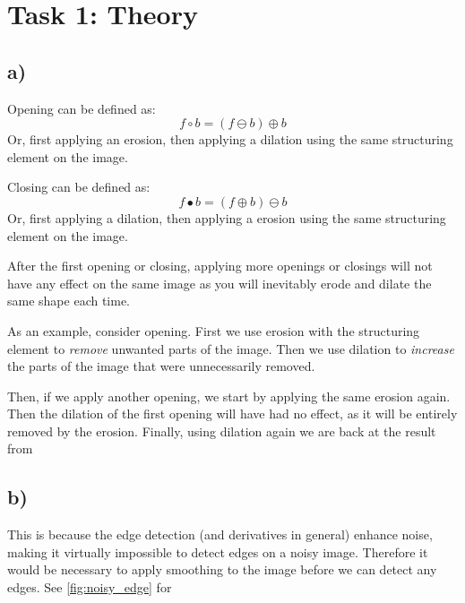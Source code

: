 \section{Task 1: Theory}
\subsection*{a)}
Opening can be defined as: 
\begin{equation}
    f \circ b = (f \ominus b) \oplus b
\end{equation}
Or, first applying an erosion, then applying a dilation using the same structuring element on the image. 

Closing can be defined as: 
\begin{equation}
    f \bullet b = (f \oplus b) \ominus b
\end{equation}
Or, first applying a dilation, then applying a erosion using the same structuring element on the image. 

After the first opening or closing, applying more openings or closings will not have any effect on the same image as you will inevitably erode and dilate the same shape each time. 

As an example, consider opening. First we use erosion with the structuring element to \textit{remove} unwanted parts of the image. Then we use dilation to \textit{increase} the parts of the image that were unnecessarily removed. 

Then, if we apply another opening, we start by applying the same erosion again. Then the dilation of the first opening will have had no effect, as it will be entirely removed by the erosion. Finally, using dilation again we are back at the result from 

\subsection*{b)}
This is because the edge detection (and derivatives in general) enhance noise, making it virtually impossible to detect edges on a noisy image. Therefore it would be necessary to apply smoothing to the image before we can detect any edges. See \cref{fig:noisy_edge} for 

